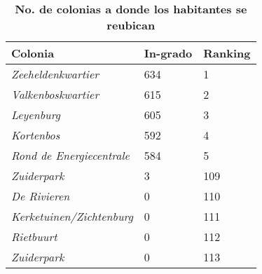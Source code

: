\def\arraystretch{1.5} %
\begin{table}[H]
\centering
\caption{\textbf{No. de colonias a donde los habitantes se reubican}}
\footnotesize
\centering
\begin{tabular}{p{3cm} p{1.5cm} p{1.5cm}}
\textbf{Colonia} &  \textbf{In-grado} & \textbf{Ranking}\\
\hline
\hline 
\textit{Zeeheldenkwartier} & 634 & 1\\
\textit{Valkenboskwartier} & 615 & 2\\
\textit{Leyenburg} & 605 & 3\\
\textit{Kortenbos} & 592 & 4\\
\textit{Rond de Energiecentrale} & 584 & 5\\
\textit{Zuiderpark} & 3 &  109\\
\textit{De Rivieren} & 0 & 110\\
\textit{Kerketuinen/Zichtenburg} & 0 & 111 \\
\textit{Rietbuurt} & 0 & 112\\
\textit{Zuiderpark} & 0 & 113
\end{tabular}

\vspace{2mm}
\end{table}

